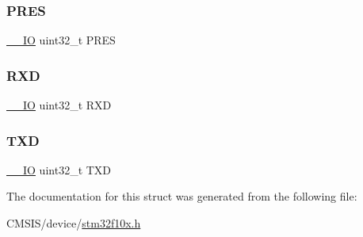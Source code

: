 \mbox{\label{struct_c_e_c___type_def_a97111895244af47cc1299eaccd77f275}} 
\subsubsection{\texorpdfstring{PRES}{PRES}}
{\footnotesize\ttfamily \mbox{\hyperlink{core__sc300_8h_aec43007d9998a0a0e01faede4133d6be}{\+\_\+\+\_\+\+IO}} uint32\+\_\+t P\+R\+ES}

\mbox{\label{struct_c_e_c___type_def_a597781fbfa1159b26609e4ce4be1be73}} 
\subsubsection{\texorpdfstring{RXD}{RXD}}
{\footnotesize\ttfamily \mbox{\hyperlink{core__sc300_8h_aec43007d9998a0a0e01faede4133d6be}{\+\_\+\+\_\+\+IO}} uint32\+\_\+t R\+XD}

\mbox{\label{struct_c_e_c___type_def_ad2f345b6426582a3e15d264d847cab63}} 
\subsubsection{\texorpdfstring{TXD}{TXD}}
{\footnotesize\ttfamily \mbox{\hyperlink{core__sc300_8h_aec43007d9998a0a0e01faede4133d6be}{\+\_\+\+\_\+\+IO}} uint32\+\_\+t T\+XD}



The documentation for this struct was generated from the following file\+:\begin{DoxyCompactItemize}
\item 
C\+M\+S\+I\+S/device/\mbox{\hyperlink{stm32f10x_8h}{stm32f10x.\+h}}\end{DoxyCompactItemize}
